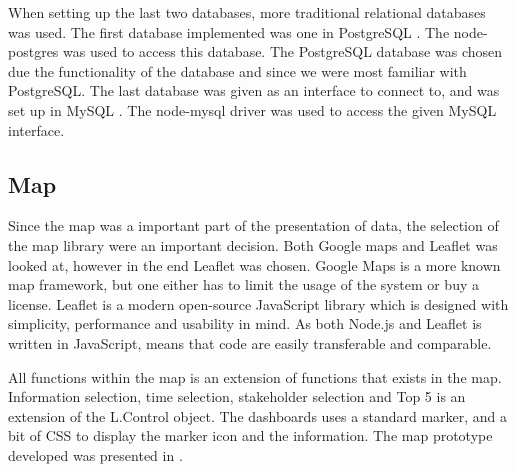 When setting up the last two databases, more traditional relational databases 
was used. The first database implemented was one in PostgreSQL
\cite{postgreSQLAbout}. The node-postgres\cite{node-postgres} was used to 
access this database. The PostgreSQL database was chosen due the functionality 
of the database and since we were most familiar with PostgreSQL. The 
last database was given as an interface to connect to, and was set up in MySQL
\cite{mySQLAbout}. The node-mysql\cite{node-mysql} driver was used to access 
the given MySQL interface.

\subsection{Map} %
\label{sub:map}
Since the map was a important part of the presentation of data, the selection
of the map library were an important decision. Both Google maps\cite{googleMaps}
and Leaflet\cite{leaflet} was looked at, however in the end Leaflet was 
chosen. Google Maps is a more known map framework, but one either has to limit 
the usage of the system or buy a license. Leaflet is a modern open-source 
JavaScript library which is designed with simplicity, performance and 
usability in mind\cite{leaflet}. As both Node.js and Leaflet is written in 
JavaScript\cite{ wiki:Javascript}, means that code are easily transferable and 
comparable. 



All functions within the map is an extension of functions that exists in the
map. Information selection, time selection, stakeholder selection and Top 5 is
an extension of the L.Control object. The dashboards uses a standard marker,
and a bit of CSS to display the marker icon and the information. The map
prototype developed was presented in .


